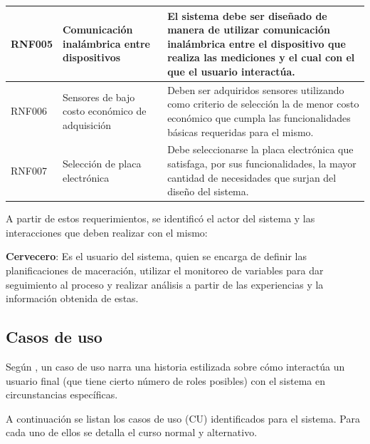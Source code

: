 \begin{longtable}{|p{1.4cm}|p{3.1cm}|p{9.5cm}|}
    RNF005 & Comunicación inalámbrica entre dispositivos & El sistema debe ser diseñado de manera de utilizar comunicación inalámbrica entre el dispositivo que realiza las mediciones y el cual con el que el usuario interactúa.
    \\ \hline
    
    RNF006 & Sensores de bajo costo económico de adquisición & Deben ser adquiridos sensores utilizando como criterio de selección la de menor costo económico que cumpla las funcionalidades básicas requeridas para el mismo.
    \\ \hline
    
    RNF007 & Selección de placa electrónica & Debe seleccionarse la placa electrónica que satisfaga, por sus funcionalidades, la mayor cantidad de necesidades que surjan del diseño del sistema.
    \\ \hline
 \end{longtable}
 
    \par
    A partir de estos requerimientos, se identificó el actor del sistema y las
    interacciones que deben realizar con el mismo:
    \par
    \textbf{Cervecero}: Es el usuario del sistema, quien se encarga de definir las planificaciones de maceración, utilizar el monitoreo de variables para dar seguimiento al proceso y realizar análisis a partir de las experiencias y la información obtenida de estas.
 
    
    \subsection{Casos de uso}
    Según \cite{Press10}, un caso de uso narra una historia estilizada sobre cómo interactúa un usuario final (que tiene cierto número de roles posibles) con el sistema en circunstancias específicas.
    \par
    A continuación se listan los casos de uso (CU) identificados para el sistema. Para cada uno de ellos se detalla el curso normal y alternativo.
    
